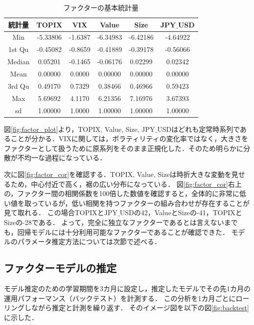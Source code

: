 ﻿\documentclass[a4paper]{jarticle}
\begin{document}
\begin{table}[H]
\caption{ファクターの基本統計量}
\begin{center}
\begin{tabular}{|c|c|c|c|c|c|}
\hline
統計量 & TOPIX & VIX & Value & Size & JPY$\_$USD\\
\hline
\hline
 Min		&-5.33806&-1.6387&-6.34983&-6.42186&-4.64922\\
 1st Qu	&-0.45082&-0.8659&-0.41889&-0.39178&-0.56066 \\
 Median	&0.05201&-0.1465&-0.06176&0.02299 &0.02342 \\
 Mean		&0.00000&0.0000&0.00000&0.00000&0.00000\\
 3rd Qu 	&0.49170&0.7329&0.38466&0.46966&0.59423\\
 Max		&5.69692&4.1170&6.21356&7.16976&3.67393 \\
\hline
 sd 		&1.00000&1.0000&1.00000&1.00000&1.00000\\

\hline
\end{tabular}
\end{center}
\label{tbl:factor_summary}
\end{table}


図\ref{fig:factor_plot}より，TOPIX, Value, Size, JPY$\_$USDはどれも定常時系列であることが分かる．VIXに関しては，ボラティリティの変化率ではなく，大きさをファクターとして扱うために原系列をそのまま正規化した．そのため明らかに分散が不均一な過程になっている．

次に図\ref{fig:factor_cor}を確認する．TOPIX, Value, Sizeは時折大きな変動を見せるため，中心付近で高く，裾の広い分布になっている．
図\ref{fig:factor_cor}右上の，ファクター間の相関係数を100倍した数値を確認すると，全体的に非常に低い値を取っているが，低い相関を持つファクターの組み合わせが存在することが見て取れる．
この場合TOPIXとJPY$\_$USDの42，ValueとSizeの-41，TOPIXとSizeの-28である．
よって，完全に独立なファクターであるとは言えないまでも，回帰モデルには十分利用可能なファクターであることが確認できた．
モデルのパラメータ推定方法については次節で述べる．


\subsection{ファクターモデルの推定}
モデル推定のための学習期間を3カ月に設定し，推定したモデルでその先1カ月の運用パフォーマンス（バックテスト）を計測する．
この分析を1カ月ごとにローリングしながら推定と計測を繰り返す．
そのイメージ図を以下の図\ref{fig:backtest}に示した．
\end{document}
